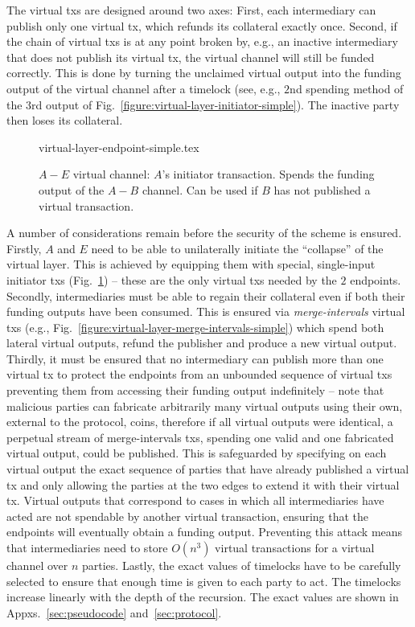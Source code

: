   The virtual txs are designed around two axes: First, each intermediary can
  publish only one virtual tx, which refunds its collateral
  exactly once. Second, if the chain of virtual txs is at any point broken by,
  e.g., an inactive intermediary that does not publish its virtual tx, the
  virtual channel will still be funded correctly. This is done by turning
  the unclaimed virtual output into the funding output of the virtual channel
  after a timelock (see, e.g., $2$nd spending method of the $3$rd output of
  Fig.~\ref{figure:virtual-layer-initiator-simple}). The inactive party then
  loses its collateral.

  \addtolength{\intextsep}{-15pt}
  \begin{figure}[!htbp]
    {virtual-layer-endpoint-simple.tex}
    \caption{$A-E$ virtual channel: $A$'s initiator transaction. Spends the
    funding output of the $A-B$ channel. Can be used if $B$ has not published
    a virtual transaction.}
    \label{figure:virtual-layer-endpoint-simple}
  \end{figure}
  \addtolength{\intextsep}{15pt}

  A number of considerations remain before the security of the scheme is
  ensured. Firstly, $A$ and $E$ need to be able to unilaterally initiate the
  ``collapse'' of the virtual layer. This is achieved by equipping them with
  special, single-input initiator txs
  (Fig.~\ref{figure:virtual-layer-endpoint-simple}) -- these are the only virtual
  txs needed by the $2$ endpoints. Secondly, intermediaries must be able to
  regain their collateral even if both their funding outputs have been consumed.
  This is ensured via \emph{merge-intervals} virtual txs (e.g.,
  Fig.~\ref{figure:virtual-layer-merge-intervals-simple}) which spend both
  lateral virtual outputs, refund the publisher and produce a new virtual
  output. Thirdly, it must be ensured that no intermediary can publish more than
  one virtual tx to protect the endpoints from an unbounded sequence of virtual
  txs preventing them from accessing their funding output indefinitely -- note
  that malicious parties can fabricate arbitrarily many virtual outputs using
  their own, external to the protocol, coins, therefore if all virtual outputs
  were identical, a perpetual stream of merge-intervals txs, spending one valid
  and one fabricated virtual output, could be published. This is safeguarded by
  specifying on each virtual output the exact sequence of parties that have
  already published a virtual tx and only allowing the parties at the two edges
  to extend it with their virtual tx. Virtual outputs that correspond to cases
  in which all intermediaries have acted are not spendable by another virtual
  transaction, ensuring that the endpoints will eventually obtain a funding
  output. Preventing this attack means that intermediaries need to store
  $O(n^3)$ virtual transactions for a virtual channel over $n$ parties. Lastly,
  the exact values of timelocks have to be carefully selected to ensure that
  enough time is given to each party to act. The timelocks increase linearly
  with the depth of the recursion. The exact values are shown in
  Appxs.~\ref{sec:pseudocode} and~\ref{sec:protocol}.

